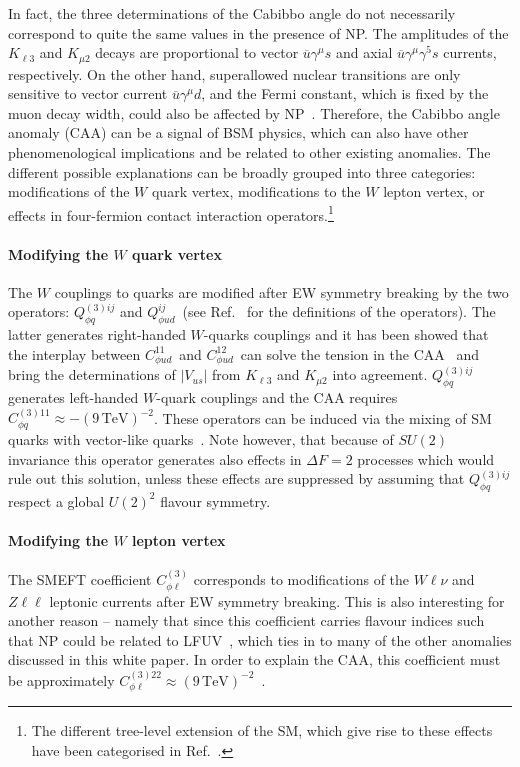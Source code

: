 \documentclass[10pt]{article}
\begin{document}
In fact, the three determinations of the Cabibbo angle do not necessarily correspond to quite the same values in the presence of NP. The amplitudes of the $K_{\ell3}$ and $K_{\mu2}$ decays are proportional to vector $\overline{u} \gamma^\mu s$ and axial $\overline{u} \gamma^\mu\gamma^5 s$ currents, respectively. On the other hand, superallowed nuclear transitions are only sensitive to vector current $\overline{u} \gamma^\mu d$, and the Fermi constant, which is fixed by the muon decay width, could also be affected by NP~\cite{Crivellin:2021njn}. Therefore, the Cabibbo angle anomaly (CAA) can be a signal of BSM physics, which can also have other phenomenological implications and be related to other existing anomalies. The different possible explanations can be broadly grouped into three categories: modifications of the \(W\) quark vertex, modifications to the \(W\) lepton vertex, or effects in four-fermion contact interaction operators.\footnote{The different tree-level extension of the SM, which give rise to these effects have been categorised in Ref.~\cite{deBlas:2017xtg}.} 

\paragraph{\boldmath Modifying the \(W\) quark vertex}
The $W$ couplings to quarks are modified after EW symmetry breaking by the two operators: \(Q_{\phi q}^{(3)ij}\) and \(Q_{\phi ud}^{ij}\,\) (see Ref.~\cite{Grzadkowski:2010es} for the definitions of the operators). The latter generates right-handed $W$-quarks couplings and it has been showed that the interplay between \(C_{\phi ud}^{11}\,\) and \(C_{\phi ud}^{12}\,\) can solve the tension in the CAA~\cite{Grossman:2019bzp} and bring the determinations of $|V_{us}|$ from $K_{\ell3}$ and $K_{\mu2}$ into agreement. \(Q_{\phi q}^{(3)ij}\) generates left-handed $W$-quark couplings and the CAA requires \(C_{\phi q}^{(3)11}\approx -(9\,\text{TeV})^{-2}\). These operators can be induced via the mixing of SM quarks with vector-like quarks~\cite{Belfatto:2019swo,Cheung:2020vqm,Belfatto:2021jhf,Branco:2021vhs,Crivellin:2021bkd}. 
Note however, that because of \(SU(2)\) invariance this operator generates also effects in \(\Delta F=2\) processes which would rule out this solution, unless these effects are suppressed by assuming that \(Q_{\phi q}^{(3)ij}\) respect a global \(U(2)^2\) flavour symmetry. 


\paragraph{\boldmath Modifying the $W$ lepton vertex}
%
The SMEFT coefficient $C_{\phi \ell}^{(3)}$ corresponds to modifications of the \(W\ell\nu\) and \(Z\ell\ell\) leptonic currents after EW symmetry breaking. This is also interesting for another reason -- namely that since this coefficient carries flavour indices such that NP could be related to LFUV~\cite{Coutinho:2019aiy,Crivellin:2020lzu}, which ties in to many of the other anomalies discussed in this white paper. In order to explain the CAA, this coefficient must be approximately \(C_{\phi \ell}^{(3)22} \approx (9\,\text{TeV})^{-2}\)~\cite{Kirk:2020wdk,Crivellin:2020ebi}.
\end{document}
